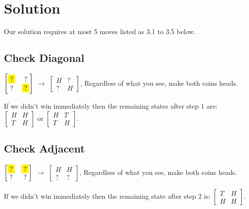 \documentclass{article}
\begin{document}
\section{Solution}
Our solution requires at most 5 moves listed as 3.1 to 3.5 below.

\subsection{Check Diagonal}

\begin{center}
$\begin{bmatrix} 
    \colorbox{yellow}{?} & ? \\
    ? & \colorbox{yellow}{?}
\end{bmatrix}$ $\rightarrow$ $\begin{bmatrix}
    H & ? \\
    ? & H 
\end{bmatrix}$, Regardless of what you see, make both coins heads.
\end{center}

If we didn't win immediately then the remaining states after step 1 are: 
$\begin{bmatrix}
    H & H \\
    T & H 
\end{bmatrix}$ or $\begin{bmatrix}
    H & T \\
    T & H 
\end{bmatrix}$.

\subsection{Check Adjacent}

\begin{center}
$\begin{bmatrix} 
    \colorbox{yellow}{?} & \colorbox{yellow}{?}  \\
    ? & ?
\end{bmatrix}$ $\rightarrow$ $\begin{bmatrix}
    H & H \\
    ? & ? 
\end{bmatrix}$, Regardless of what you see, make both coins heads.
\end{center}

If we didn't win immediately then the remaining state after step 2 is:
$\begin{bmatrix}
    T & H \\
    H & H 
\end{bmatrix}$.
\end{document}
